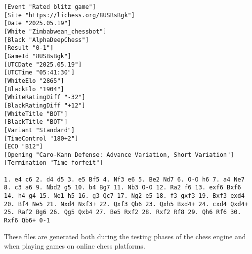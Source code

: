 \begin{lstlisting}[basicstyle=\ttfamily\small, captionpos=b,breaklines=true, frame=single, caption={Example of a PGN file}, label={lst:pgn-example}]
[Event "Rated blitz game"]
[Site "https://lichess.org/8USBsBgk"]
[Date "2025.05.19"]
[White "Zimbabwean_chessbot"]
[Black "AlphaDeepChess"]
[Result "0-1"]
[GameId "8USBsBgk"]
[UTCDate "2025.05.19"]
[UTCTime "05:41:30"]
[WhiteElo "2865"]
[BlackElo "1904"]
[WhiteRatingDiff "-32"]
[BlackRatingDiff "+12"]
[WhiteTitle "BOT"]
[BlackTitle "BOT"]
[Variant "Standard"]
[TimeControl "180+2"]
[ECO "B12"]
[Opening "Caro-Kann Defense: Advance Variation, Short Variation"]
[Termination "Time forfeit"]

1. e4 c6 2. d4 d5 3. e5 Bf5 4. Nf3 e6 5. Be2 Nd7 6. O-O h6 7. a4 Ne7 8. c3 a6 9. Nbd2 g5 10. b4 Bg7 11. Nb3 O-O 12. Ra2 f6 13. exf6 Bxf6 14. h4 g4 15. Ne1 h5 16. g3 Qc7 17. Ng2 e5 18. f3 gxf3 19. Bxf3 exd4 20. Bf4 Ne5 21. Nxd4 Nxf3+ 22. Qxf3 Qb6 23. Qxh5 Bxd4+ 24. cxd4 Qxd4+ 25. Raf2 Bg6 26. Qg5 Qxb4 27. Be5 Rxf2 28. Rxf2 Rf8 29. Qh6 Rf6 30. Rxf6 Qb6+ 0-1
\end{lstlisting}

These files are generated both during the testing phases of the chess engine and when playing games on online chess platforms.